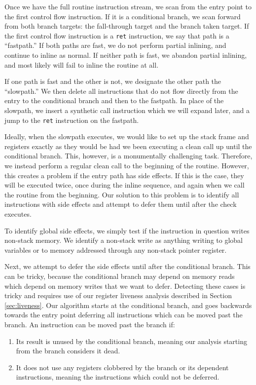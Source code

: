 Once we have the full routine instruction stream, we scan from the entry point
to the first control flow instruction.  If it is a conditional branch, we scan
forward from both branch targets: the fall-through target and the branch taken
target.  If the first control flow instruction is a {\tt ret} instruction, we
say that path is a ``fastpath.''  If both paths are fast, we do not perform
partial inlining, and continue to inline as normal.  If neither path is fast, we
abandon partial inlining, and most likely will fail to inline the routine at
all.

If one path is fast and the other is not, we designate the other path the
``slowpath.''  We then delete all instructions that do not flow directly from
the entry to the conditional branch and then to the fastpath.  In place of the
slowpath, we insert a synthetic call instruction which we will expand later, and
a jump to the {\tt ret} instruction on the fastpath.

Ideally, when the slowpath executes, we would like to set up the stack frame and
registers exactly as they would be had we been executing a clean call up until
the conditional branch.  This, however, is a monumentally challenging task.
Therefore, we instead perform a regular clean call to the beginning of the
routine.  However, this creates a problem if the entry path has side effects.
If this is the case, they will be executed twice, once during the inline
sequence, and again when we call the routine from the beginning.  Our solution
to this problem is to identify all instructions with side effects and attempt to
defer them until after the check executes.

To identify global side effects, we simply test if the instruction in question
writes non-stack memory.  We identify a non-stack write as anything writing to
global variables or to memory addressed through any non-stack pointer register.

Next, we attempt to defer the side effects until after the conditional branch.
This can be tricky, because the conditional branch may depend on memory reads
which depend on memory writes that we want to defer.  Detecting these cases is
tricky and requires use of our register liveness analysis described in Section
\ref{sec:liveness}.  Our algorithm starts at the conditional branch, and goes
backwards towards the entry point deferring all instructions which can be moved
past the branch.  An instruction can be moved past the branch if:

\begin{enumerate}
\item Its result is unused by the conditional branch, meaning our analysis
starting from the branch considers it dead.
\item It does not use any registers clobbered by the branch or its dependent
instructions, meaning the instructions which could not be deferred.
\end{enumerate}

